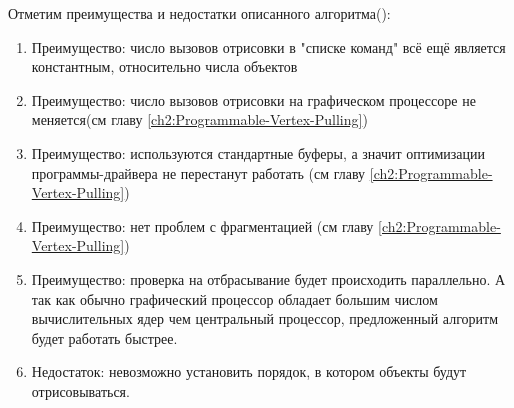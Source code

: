 Отметим преимущества и недостатки описанного алгоритма():
\begin{enumerate}[1.] 
	\item Преимущество: число вызовов отрисовки в "списке команд" всё ещё является константным, относительно числа объектов
	\item Преимущество: число вызовов отрисовки на графическом процессоре не меняется(см главу \ref{ch2:Programmable-Vertex-Pulling})
	\item Преимущество: используются стандартные буферы, а значит оптимизации программы-драйвера не перестанут работать (см главу \ref{ch2:Programmable-Vertex-Pulling})
	\item Преимущество: нет проблем с фрагментацией (см главу \ref{ch2:Programmable-Vertex-Pulling})
	\item Преимущество: проверка на отбрасывание будет происходить параллельно. А так как обычно графический процессор обладает большим числом вычислительных ядер чем центральный процессор, предложенный алгоритм будет работать быстрее.
	\item Недостаток: невозможно установить порядок, в котором объекты будут отрисовываться.
\end{enumerate}